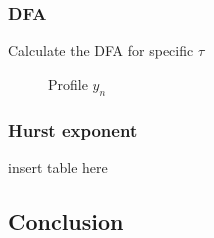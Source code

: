 \subsubsection{DFA}
Calculate the DFA for specific $\tau$

\begin{figure}[H]
	\centering
	\begin{subfigure}{\textwidth}
		
	\end{subfigure}
	
	\begin{subfigure}{\textwidth}
		
	\end{subfigure}
	\caption{Profile $y_n$}
\end{figure}

\begin{figure}[H]
	
\end{figure}
\subsubsection{Hurst exponent}
insert table here


\subsection{Conclusion}